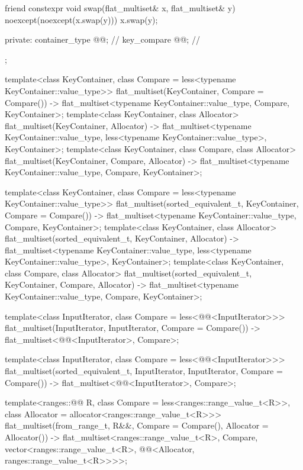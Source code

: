 \begin{codeblock}
{{    friend constexpr void swap(flat_multiset& x, flat_multiset& y)
      noexcept(noexcept(x.swap(y)))
      { x.swap(y); }

  private:
    container_type @@;           // \expos
    key_compare @@;        // \expos
  };

  template<class KeyContainer, class Compare = less<typename KeyContainer::value_type>>
    flat_multiset(KeyContainer, Compare = Compare())
      -> flat_multiset<typename KeyContainer::value_type, Compare, KeyContainer>;
  template<class KeyContainer, class Allocator>
    flat_multiset(KeyContainer, Allocator)
      -> flat_multiset<typename KeyContainer::value_type,
                       less<typename KeyContainer::value_type>, KeyContainer>;
  template<class KeyContainer, class Compare, class Allocator>
    flat_multiset(KeyContainer, Compare, Allocator)
      -> flat_multiset<typename KeyContainer::value_type, Compare, KeyContainer>;

  template<class KeyContainer, class Compare = less<typename KeyContainer::value_type>>
    flat_multiset(sorted_equivalent_t, KeyContainer, Compare = Compare())
      -> flat_multiset<typename KeyContainer::value_type, Compare, KeyContainer>;
  template<class KeyContainer, class Allocator>
    flat_multiset(sorted_equivalent_t, KeyContainer, Allocator)
      -> flat_multiset<typename KeyContainer::value_type,
                       less<typename KeyContainer::value_type>, KeyContainer>;
  template<class KeyContainer, class Compare, class Allocator>
    flat_multiset(sorted_equivalent_t, KeyContainer, Compare, Allocator)
      -> flat_multiset<typename KeyContainer::value_type, Compare, KeyContainer>;

  template<class InputIterator, class Compare = less<@@<InputIterator>>>
    flat_multiset(InputIterator, InputIterator, Compare = Compare())
      -> flat_multiset<@@<InputIterator>, Compare>;

  template<class InputIterator, class Compare = less<@@<InputIterator>>>
    flat_multiset(sorted_equivalent_t, InputIterator, InputIterator, Compare = Compare())
      -> flat_multiset<@@<InputIterator>, Compare>;

  template<ranges::@@ R, class Compare = less<ranges::range_value_t<R>>,
           class Allocator = allocator<ranges::range_value_t<R>>>
    flat_multiset(from_range_t, R&&, Compare = Compare(), Allocator = Allocator())
      -> flat_multiset<ranges::range_value_t<R>, Compare,
                       vector<ranges::range_value_t<R>,
                              @@<Allocator, ranges::range_value_t<R>>>>;

}
\end{codeblock}
